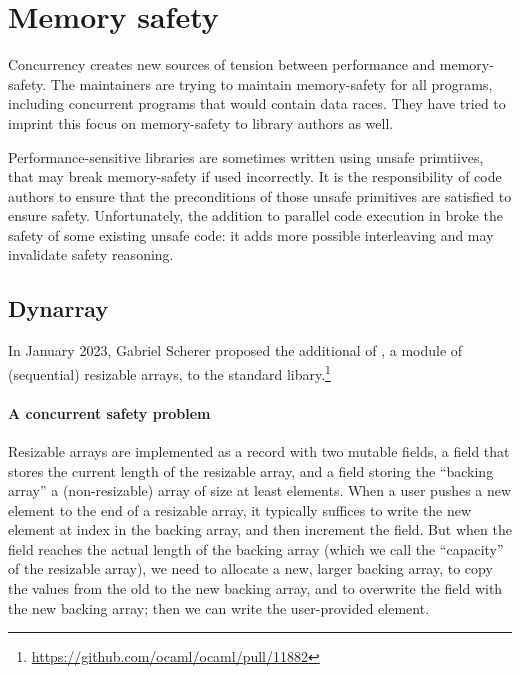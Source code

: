 \section{Memory safety}

Concurrency creates new sources of tension between performance and memory-safety. The \OCaml maintainers are trying to maintain memory-safety for all \OCaml programs, including concurrent programs that would contain data races. They have tried to imprint this focus on memory-safety to library authors as well.

Performance-sensitive \OCaml libraries are sometimes written using unsafe primtiives, that may break memory-safety if used incorrectly. It is the responsibility of code authors to ensure that the preconditions of those unsafe primitives are satisfied to ensure safety. Unfortunately, the addition to parallel code execution in \OCamlFive broke the safety of some existing unsafe code: it adds more possible interleaving and may invalidate safety reasoning.

\subsection{Dynarray} In January 2023, Gabriel Scherer proposed the additional of , a module of (sequential) resizable arrays, to the \OCaml standard libary.\footnote{\url{https://github.com/ocaml/ocaml/pull/11882}} 

\paragraph{A concurrent safety problem}

Resizable arrays are implemented as a record with two mutable fields, a  field that stores the current length of the resizable array, and a  field storing the ``backing array'' a (non-resizable) array of size at least  elements. When a user pushes a new element to the end of a resizable array, it typically suffices to write the new element at index  in the backing array, and then increment the  field. But when the  field reaches the actual length of the backing array (which we call the ``capacity'' of the resizable array), we need to allocate a new, larger backing array, to copy the values from the old to the new backing array, and to overwrite the  field with the new backing array; then we can write the user-provided element.


